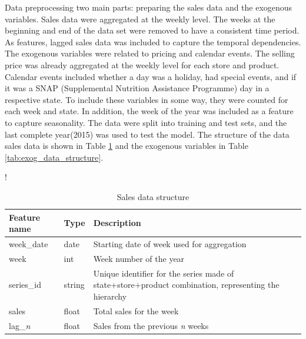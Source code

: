Data preprocessing two main parts: preparing the sales data and the exogenous variables.
Sales data were aggregated at the weekly level.
The weeks at the beginning and end of the data set were removed to have a consistent time period.
As features, lagged sales data was included to capture the temporal dependencies.
The exogenous variables were related to pricing and calendar events.
The selling price was already aggregated at the weekly level for each store and product.
Calendar events included whether a day was a holiday, had special events, and if it was a SNAP (Supplemental Nutrition Assistance Programme) day in a respective state.
To include these variables in some way, they were counted for each week and state.
In addition, the week of the year was included as a feature to capture seasonality.
The data were split into training and test sets, and the last complete year(2015) was used to test the model.
The structure of the data sales data is shown in Table \ref{tab:data_structure} and the exogenous variables in Table \ref{tab:exog_data_structure}.



\begin{table}
    \centering
    \begin{resizebox}{\linewidth}{!}

        \begin{tabular}{
            |p{} %
            |p{}  %
            |p{}  %
            |}
            \hline
            Feature name  & Type   & Description                                                                                         \\
            \hline
            week\_date    & date   & Starting date of week used for aggregation                                                          \\
            \hline
            week          & int    & Week number of the year                                                                             \\
            \hline
            series\_id    & string & Unique identifier for the series made of state+store+product combination,  representing the hierarchy \\
            \hline
            sales         & float  & Total sales for the week                                                                            \\
            \hline
            lag\_\emph{n} & float  & Sales from the previous \emph{n} weeks                                                              \\
            \hline
        \end{tabular}%
    \end{resizebox}
    \caption{ Sales data structure}
    \label{tab:data_structure}
\end{table}



